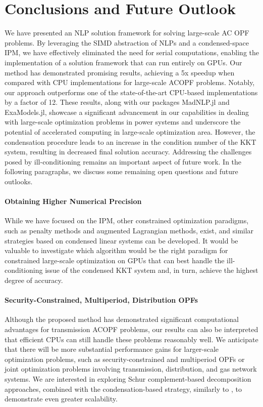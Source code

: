 \documentclass{IEEEtran4PSCC} %
\begin{document}
\section{Conclusions and Future Outlook}\label{sec:conc}
We have presented an NLP solution framework for solving large-scale AC
OPF problems. By leveraging the SIMD abstraction of NLPs and a
condensed-space IPM, we have effectively eliminated the need for
serial computations, enabling the implementation of a solution
framework that can run entirely on GPUs. Our method has demonstrated
promising results, achieving a 5x speedup when compared with CPU
implementations for large-scale ACOPF problems. Notably, our approach
outperforms one of the state-of-the-art CPU-based implementations by
a factor of 12. These results, along with our packages
MadNLP.jl and ExaModels.jl, showcase a significant advancement in our
capabilities in dealing with large-scale optimization problems in
power systems and underscore the potential of accelerated computing in
large-scale optimization area. However, the condensation procedure
leads to an increase in the condition number of the KKT system,
resulting in decreased final solution accuracy. Addressing the
challenges posed by ill-conditioning remains an important aspect
of future work. In the following paragraphs, we discuss some
remaining open questions and future outlooks.

\paragraph*{Obtaining Higher Numerical Precision}
While we have focused on the IPM, other constrained optimization
paradigms, such as penalty methods and augmented Lagrangian methods,
exist, and similar strategies based on condensed linear systems can be
developed. It would be valuable to investigate which algorithm would
be the right paradigm for constrained large-scale optimization on GPUs
that can best handle the ill-conditioning issue of the condensed KKT
system and, in turn, achieve the highest degree of accuracy.

\paragraph*{Security-Constrained, Multiperiod, Distribution OPFs}
Although the proposed method has demonstrated significant computational
advantages for transmission ACOPF problems, our results can also
be interpreted that efficient CPUs can still handle these problems
reasonably well. We anticipate that there will be more substantial
performance gains for larger-scale optimization problems, such as
security-constrained and multiperiod OPFs or joint optimization
problems involving transmission, distribution, and gas network
systems. We are interested in exploring Schur complement-based
decomposition approaches, combined with the condensation-based
strategy, similarly to \cite{pacaud2023parallel}, to demonstrate even
greater scalability.
\end{document}
